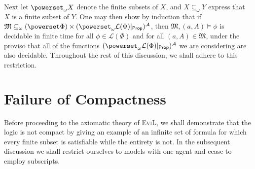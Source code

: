 \documentclass[11pt]{article}
\numberwithin{equation}{subsection}
\begin{document}
Next let $\powerset_\omega X$ denote the finite subsets of $X$, and $X \subseteq_\omega Y$ express 
that $X$ is a finite subset of $Y$.  One may then show by induction that if 
 $\mathfrak{M} \subseteq_\omega (\powerset \Phi) \times (\powerset_\omega \mathcal{L}(\Phi)|_{\mathsf{Prop}})^\mathcal{A}$, 
 then $\mathfrak{M},(a,A) \models \phi$ is decidable in finite time for all 
 $\phi \in \mathcal{L}(\Phi)$ and for all $(a,A) \in \mathfrak{M}$, under the proviso that all of the functions $(\powerset_\omega \mathcal{L}(\Phi)|_{\mathsf{Prop}})^\mathcal{A}$ we are considering are also decidable.  Throughout the rest of this discussion, we shall adhere to this restriction.

\section{Failure of Compactness}

Before proceeding to the axiomatic theory of \textsc{EviL}, we shall demonstrate that the logic is not compact by giving an example of an infinite set of formula for which every finite subset is satisfiable while the entirety is not.  In the subsequent discussion we shall restrict ourselves to models with one agent and cease to employ subscripts.
\end{document}
